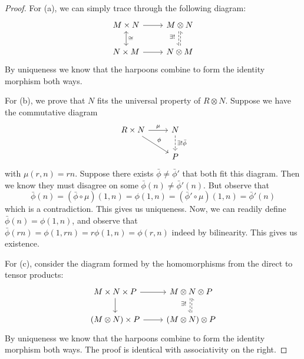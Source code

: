 \begin{proof}
    For (a), we can simply trace through the following diagram:
    \begin{equation*}
        \begin{tikzcd}
            M \times N \arrow{r} \arrow[leftrightarrow]{d}{\cong} &
            M \otimes N \arrow[harpoon', dashed, shift right=0.25ex]{d}[xshift=-.5ex, yshift=.5ex, swap]{\exists!} \\
            N \times M \arrow{r} &
            N \otimes M \arrow[harpoon', dashed, shift right=0.25ex]{u}
        \end{tikzcd}
    \end{equation*}
    By uniqueness we know that the harpoons combine to form the identity morphism both ways.

    For (b), we prove that \(N\) fits the universal property of \(R \otimes N\).
    Suppose we have the commutative diagram
    \begin{equation*}
        \begin{tikzcd}
            R \times N \arrow{r}{\mu} \arrow{rd}{\phi} &
            N \arrow[dashrightarrow]{d}{\exists!\bar{\phi}} \\
            & P
        \end{tikzcd}
    \end{equation*}
    with \(\mu(r,n) = rn\).
    Suppose there exists \(\bar{\phi}\neq\bar{\phi}'\) that both fit this diagram.
    Then we know they must disagree on some \(\bar{\phi}(n) \neq \bar{\phi}'(n)\).
    But observe that
    \begin{equation*}
        \bar{\phi}(n) = (\bar{\phi}\circ\mu)(1,n) = \phi(1,n)
        = (\bar{\phi}'\circ\mu)(1,n) = \bar{\phi}'(n)
    \end{equation*}
    which is a contradiction.
    This gives us uniqueness.
    Now, we can readily define \(\bar{\phi}(n) = \phi(1,n)\),
    and observe that \(\bar{\phi}(rn) = \phi(1,rn) = r\phi(1,n) = \phi(r,n)\) indeed by bilinearity.
    This gives us existence.

    For (c), consider the diagram formed by the homomorphisms from the direct to tensor products:
    \begin{equation*}
        \begin{tikzcd}
            M \times N \times P \arrow{r} \arrow{d} &
            M \otimes N \otimes P \arrow[harpoon', dashed, shift right=0.25ex]{d}[xshift=-.5ex, yshift=.5ex, swap]{\exists!} \\
            (M \otimes N) \times P \arrow{r} &
            (M \otimes N) \otimes P \arrow[harpoon', dashed, shift right=0.25ex]{u}
        \end{tikzcd}
    \end{equation*}
    By uniqueness we know that the harpoons combine to form the identity morphism both ways.
    The proof is identical with associativity on the right.


\end{proof}
